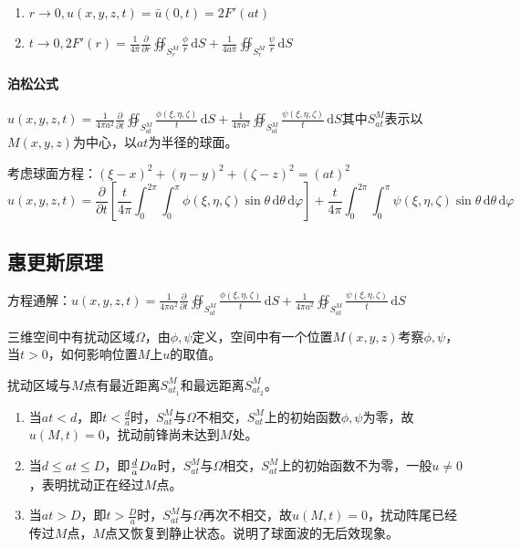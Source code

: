 \begin{enumerate}
    \item \(r\rightarrow0,u(x,y,z,t)=\bar{u}(0,t)=2F'(at)\)
    \item \(t\rightarrow0,2F'(r)=\frac{1}{4\pi}\frac{\partial}{\partial r}\oiint_{S_r^M}{\frac{\phi}{r}\,\mathrm{d}S}+\frac{1}{4a\pi}\oiint_{S_r^M}{\frac{\psi}{r}\,\mathrm{d}S}\)
\end{enumerate}

\paragraph{泊松公式}\(u(x,y,z,t)=\frac{1}{4\pi a^2}\frac{\partial}{\partial t}\oiint_{S_{at}^M}{\frac{\phi(\xi,\eta,\zeta)}{t}\,\mathrm{d}S}+\frac{1}{4\pi a^2}\oiint_{S_{at}^M}{\frac{\psi(\xi,\eta,\zeta)}{t}\,\mathrm{d}S}\)其中\(S_{at}^M\)表示以\(M(x,y,z)\)为中心，以\(at\)为半径的球面。

考虑球面方程：\((\xi-x)^2+(\eta-y)^2+(\zeta-z)^2=(at)^2\)
\[
u(x,y,z,t)=\frac{\partial}{\partial t}\left[\frac{t}{4\pi}\int_{0}^{2\pi}\int_{0}^{\pi}\phi(\xi,\eta,\zeta)\sin\theta\,\mathrm{d}\theta\,\mathrm{d}\varphi\right]+\frac{t}{4\pi}\int_{0}^{2\pi}\int_{0}^{\pi}\psi(\xi,\eta,\zeta)\sin\theta\,\mathrm{d}\theta\,\mathrm{d}\varphi
\]

\subsection{惠更斯原理}

方程通解：\(u(x,y,z,t)=\frac{1}{4\pi a^2}\frac{\partial}{\partial t}\oiint_{S_{at}^M}{\frac{\phi(\xi,\eta,\zeta)}{t}\,\mathrm{d}S}+\frac{1}{4\pi a^2}\oiint_{S_{at}^M}{\frac{\psi(\xi,\eta,\zeta)}{t}\,\mathrm{d}S}\)

三维空间中有扰动区域\(\Omega\)，由\(\phi,\psi\)定义，空间中有一个位置\(M(x,y,z)\)考察\(\phi,\psi\)，当\(t>0\)，如何影响位置\(M\)上\(u\)的取值。

扰动区域与\(M\)点有最近距离\(S_{at_1}^M\)和最远距离\(S_{at_2}^M\)。
\begin{enumerate}
    \item 当\(at<d\)，即\(t<\frac{d}{a}\)时，\(S_{at}^M\)与\(\Omega\)不相交，\(S_{at}^M\)上的初始函数\(\phi,\psi\)为零，故\(u\left(M,t\right)=0\)，扰动前锋尚未达到\(M\)处。
    \item 当\(d\le at\le D\)，即\(\frac{d}{a}\let\le\frac{D}{a}\)时，\(S_{at}^M\)与\(\Omega\)相交，\(S_{at}^M\)上的初始函数不为零，一般\(u\neq0\)，表明扰动正在经过\(M\)点。
    \item 当\(at>D\)，即\(t>\frac{D}{a}\)时，\(S_{at}^M\)与\(\Omega\)再次不相交，故\(u(M,t)=0\)，扰动阵尾已经传过\(M\)点，\(M\)点又恢复到静止状态。说明了球面波的无后效现象。
\end{enumerate}